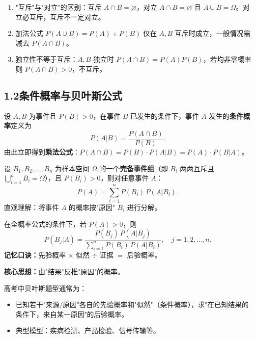 \documentclass[12pt, a4paper]{ctexart}
\begin{document}
\begin{warnbox}[高考易错点]
\begin{enumerate}[leftmargin=1.5em]
  \item "互斥"与"对立"的区别：互斥 $A\cap B=\varnothing$，对立 $A\cap B=\varnothing$ 且 $A\cup B=\Omega$。对立必互斥，互斥不一定对立。
  \item 加法公式 $P(A\cup B)=P(A)+P(B)$ 仅在 $A,B$ 互斥时成立，一般情况需减去 $P(A\cap B)$。
  \item 独立性不等于互斥：$A,B$ 独立时 $P(A\cap B)=P(A)P(B)$，若均非零概率则 $P(A\cap B)>0$，不互斥。
\end{enumerate}
\end{warnbox}

\subsection*{1.2\quad 条件概率与贝叶斯公式}

\begin{knowledgebox}[条件概率]
设 $A,B$ 为事件且 $P(B)>0$，在事件 $B$ 已发生的条件下，事件 $A$ 发生的\textbf{条件概率}定义为
\[
P(A|B)=\frac{P(A\cap B)}{P(B)}.
\]
由此立即得到\textbf{乘法公式}：$P(A\cap B)=P(B)\cdot P(A|B)=P(A)\cdot P(B|A)$。
\end{knowledgebox}

\begin{knowledgebox}[全概率公式]
设 $B_1,B_2,\dots,B_n$ 为样本空间 $\Omega$ 的一个\textbf{完备事件组}（即 $B_i$ 两两互斥且 $\bigcup_{i=1}^{n}B_i=\Omega$），且 $P(B_i)>0$，则对任意事件 $A$：
\[
P(A)=\sum_{i=1}^{n}P(B_i)\,P(A|B_i).
\]
直观理解：将事件 $A$ 的概率按"原因" $B_i$ 进行分解。
\end{knowledgebox}

\begin{knowledgebox}
在全概率公式的条件下，若 $P(A)>0$，则
\[
P(B_j|A)=\frac{P(B_j)\,P(A|B_j)}{\displaystyle\sum_{i=1}^{n}P(B_i)\,P(A|B_i)},\quad j=1,2,\dots,n.
\]
\textbf{记忆口诀：}先验概率 $\times$ 似然 $\div$ 证据 $=$ 后验概率。\par
\textbf{核心思想：}由"结果"反推"原因"的概率。
\end{knowledgebox}

\begin{tipbox}[贝叶斯公式在高考中的应用模式]
高考中贝叶斯题型通常为：\par
\begin{itemize}[leftmargin=1.5em]
  \item 已知若干"来源/原因"各自的先验概率和"似然"（条件概率），求"在已知结果的条件下，来自某一原因"的后验概率。
  \item 典型模型：疾病检测、产品检验、信号传输等。
\end{itemize}
\end{tipbox}
\end{document}
